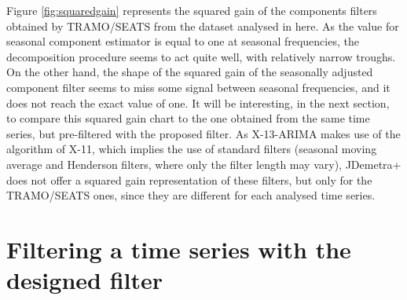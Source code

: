 \documentclass[english,blauw]{cbsdiscussionpaper}
\begin{document}
Figure \ref{fig:squaredgain} represents the squared gain of the components filters obtained by TRAMO/SEATS from the dataset analysed in here. As the value for seasonal component estimator is equal to one at seasonal frequencies, the decomposition procedure seems to act quite well, with relatively narrow troughs. On the other hand, the shape of the squared gain of the seasonally adjusted component filter seems to miss some signal between seasonal frequencies, and it does not reach the exact value of one. It will be interesting, in the next section, to compare this squared gain chart to the one obtained from the same time series, but pre-filtered with the proposed filter.
As X-13-ARIMA makes use of the algorithm of X-11, which implies the use of standard filters (seasonal moving average and Henderson filters, where only the filter length may vary), JDemetra+ does not offer a squared gain representation of these filters, but only for the TRAMO/SEATS ones, since they are different for each analysed time series.
\section{Filtering a time series with the designed filter}
\end{document}
